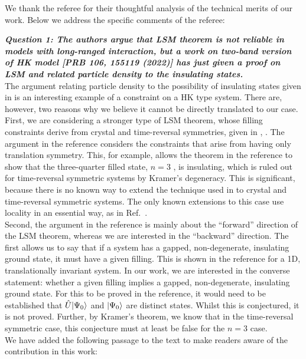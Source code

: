 \documentclass[aps,reprint,notitlepage,onecolumn,12pt]{revtex4-2}
\DeclarePairedDelimiter\ket{\lvert}{\rangle}%
\numberwithin{equation}{section}
\begin{document}
We thank the referee for their thoughtful analysis of the technical merits of our work. Below we address the specific comments of the referee:


\textbf{\textit{Question 1: The authors argue that LSM theorem is not reliable in models with long-ranged interaction, but a work on two-band version of HK model [PRB 106, 155119 (2022)] has just given a proof on LSM and related
particle density to the insulating states.}}\\

The argument relating particle density to the possibility of insulating states given in \cite{lsmyin2022} is an interesting example of a constraint on a HK type system.  There are, however, two reasons why we believe it cannot be directly translated to our case. First, we are considering a stronger type of LSM theorem, whose filling constraints derive from crystal and time-reversal symmetries, given in \cite{watanabe2015filling}, \cite{watanabe2016fillingenforced}. The argument in the reference considers the constraints that arise from having only translation symmetry. This, for example, allows the theorem in the reference to show that the three-quarter filled state, $n=3$ , is insulating, which is ruled out for time-reversal symmetric systems by Kramer's degeneracy. This is significant, because there is no known way to extend the technique used in \cite{lsmyin2022} to crystal and time-reversal symmetric systems. The only known extensions to this case use locality in an essential way, as in Ref.~\cite{watanabe2015filling}.\\

\indent Second, the argument in the reference is mainly about the ``forward'' direction of the LSM theorem, whereas we are interested in the ``backward'' direction. The first allows us to say that if a system has a gapped, non-degenerate, insulating ground state, it must have a given filling. This is shown in the reference for a 1D, translationally invariant system. In our work, we are interested in the converse statement: whether a given filling implies a gapped, non-degenerate, insulating ground state. For this to be proved in the reference, it would need to be established that $\hat{U}\ket{\Psi_0}$ and $\ket{\Psi_0}$ are distinct states. Whilst this is conjectured, it is not proved. Further, by Kramer's theorem, we know that in the time-reversal symmetric case, this conjecture must at least be false for the $n=3$ case. \\

We have added the following passage to the text to make readers aware of the contribution in this work:
\end{document}
